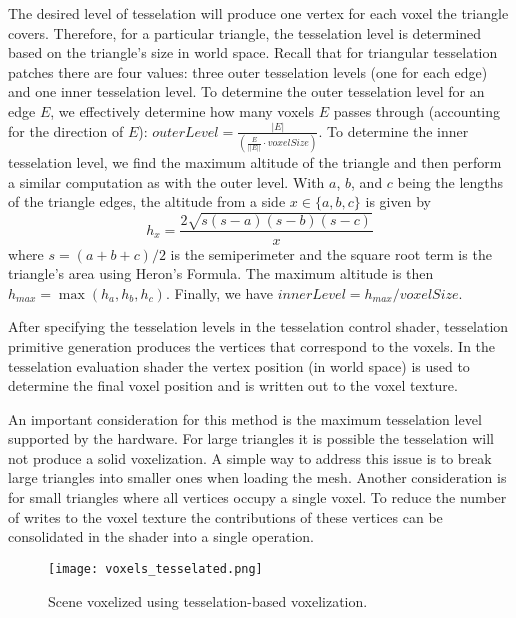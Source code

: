 The desired level of tesselation will produce one vertex for each voxel the triangle covers. Therefore, for a particular triangle, the tesselation level is determined based on the triangle's size in world space. Recall that for triangular tesselation patches there are four values: three outer tesselation levels (one for each edge) and one inner tesselation level. To determine the outer tesselation level for an edge $E$, we effectively determine how many voxels $E$ passes through (accounting for the direction of $E$): $\displaystyle outerLevel = \frac{|E|}{(\frac{E}{||E||} \cdot voxelSize)}$. To determine the inner tesselation level, we find the maximum altitude of the triangle and then perform a similar computation as with the outer level. With $a$, $b$, and $c$ being the lengths of the triangle edges, the altitude from a side $x \in \{a, b, c\}$ is given by
\[
    h_x = \frac{2 \sqrt{s(s-a)(s-b)(s-c)}}{x}
\]
where $s = (a + b + c) / 2$ is the semiperimeter and the square root term is the triangle's area using Heron's Formula. The maximum altitude is then $h_{max} = \max(h_a, h_b, h_c)$. Finally, we have $innerLevel = h_{max} / voxelSize$. %

After specifying the tesselation levels in the tesselation control shader, tesselation primitive generation produces the vertices that correspond to the voxels. In the tesselation evaluation shader the vertex position (in world space) is used to determine the final voxel position and is written out to the voxel texture.

An important consideration for this method is the maximum tesselation level supported by the hardware. For large triangles it is possible the tesselation will not produce a solid voxelization. A simple way to address this issue is to break large triangles into smaller ones when loading the mesh. Another consideration is for small triangles where all vertices occupy a single voxel. To reduce the number of writes to the voxel texture the contributions of these vertices can be consolidated in the shader into a single operation.

\begin{figure}[h!]
\centering
    \texttt{[image: voxels\_tesselated.png]}
    \caption{Scene voxelized using tesselation-based voxelization.}
    \label{fig:tesselatedvoxels}
\end{figure}

